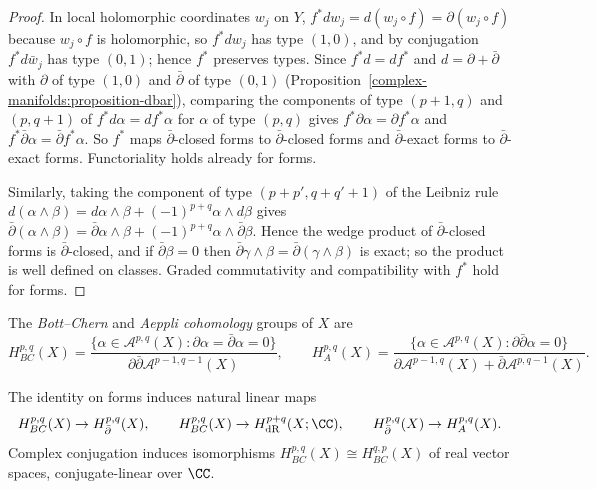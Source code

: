 \begin{proof}
In local holomorphic coordinates $w_j$ on $Y$, $f^*dw_j = d(w_j \circ f) = \partial(w_j \circ f)$ because $w_j \circ f$ is holomorphic, so $f^*dw_j$ has type $(1,0)$, and by conjugation $f^*d\bar w_j$ has type $(0,1)$;
hence $f^*$ preserves types. Since $f^*d = df^*$ and $d = \partial + \bar\partial$ with $\partial$ of type $(1,0)$ and $\bar\partial$ of type $(0,1)$ (Proposition~\ref{complex-manifolds:proposition-dbar}), comparing the
components of type $(p+1,q)$ and $(p,q+1)$ of $f^*d\alpha = df^*\alpha$ for $\alpha$ of type $(p,q)$ gives $f^*\partial\alpha = \partial f^*\alpha$ and $f^*\bar\partial\alpha = \bar\partial f^*\alpha$. So $f^*$ maps
$\bar\partial$-closed forms to $\bar\partial$-closed forms and $\bar\partial$-exact forms to $\bar\partial$-exact forms. Functoriality holds already for forms.

Similarly, taking the component of type $(p+p',q+q'+1)$ of the Leibniz rule $d(\alpha \wedge \beta) = d\alpha \wedge \beta + (-1)^{p+q}\alpha \wedge d\beta$ gives
$\bar\partial(\alpha \wedge \beta) = \bar\partial\alpha \wedge \beta + (-1)^{p+q}\alpha \wedge \bar\partial\beta$. Hence the wedge product of $\bar\partial$-closed forms is $\bar\partial$-closed, and if $\bar\partial\beta = 0$
then $\bar\partial\gamma \wedge \beta = \bar\partial(\gamma \wedge \beta)$ is exact; so the product is well defined on classes. Graded commutativity and compatibility with $f^*$ hold for forms.
\end{proof}

\begin{definition}\label{complex-manifolds:definition-bott-chern}
The \emph{Bott--Chern} and \emph{Aeppli cohomology} groups of $X$ are
\[
H^{p,q}_{BC}(X) = \frac{\{\alpha \in \mathcal{A}^{p,q}(X) : \partial\alpha = \bar\partial\alpha = 0\}}{\partial\bar\partial\mathcal{A}^{p-1,q-1}(X)}, \qquad
H^{p,q}_{A}(X) = \frac{\{\alpha \in \mathcal{A}^{p,q}(X) : \partial\bar\partial\alpha = 0\}}{\partial\mathcal{A}^{p-1,q}(X) + \bar\partial\mathcal{A}^{p,q-1}(X)}.
\]
\end{definition}

\begin{lemma}\label{complex-manifolds:lemma-bott-chern-maps}
The identity on forms induces natural linear maps
\[
H^{p,q}_{BC}(X) \to H^{p,q}_{\bar\partial}(X), \qquad H^{p,q}_{BC}(X) \to H^{p+q}_{\mathrm{dR}}(X; \CC), \qquad H^{p,q}_{\bar\partial}(X) \to H^{p,q}_{A}(X).
\]
Complex conjugation induces isomorphisms $H^{p,q}_{BC}(X) \cong H^{q,p}_{BC}(X)$ of real vector spaces, conjugate-linear over $\CC$.
\end{lemma}

